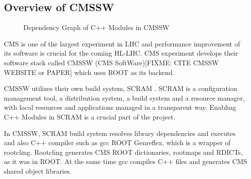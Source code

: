 \documentclass[12pt]{iopart}
\begin{document}
\subsection{Overview of CMSSW}
\label{cmssw}

\begin{figure}[!h]
  \centering
  \caption{Dependency Graph of C++ Modules in CMSSW}
  \label{fig:pchandpcm}
\end{figure}

CMS \cite{cms} is one of the largest experiment in LHC and performance improvement of its software is crucial for the coming HL-LHC. CMS experiment develops their software stack called CMSSW (CMS SoftWare)[FIXME: CITE CMSSW WEBSITE or PAPER] which uses ROOT as its backend.

CMSSW utilizes their own build system, SCRAM \cite{scram}. SCRAM is a configuration management tool, a distribution system, a build system and a resource manager, with local resources and applications managed in a transparent way. Enabling C++ Modules in SCRAM is a crucial part of the project.

In CMSSW, SCRAM build system resolves library dependencies and executes and also C++ compiler such as gcc ROOT Genreflex, which is a wrapper of rootcling. Rootcling generates CMS ROOT dictionaries, rootmaps and RDICTs, as it was in ROOT. At the same time gcc compiles C++ files and generates CMS shared object libraries. 
\end{document}
